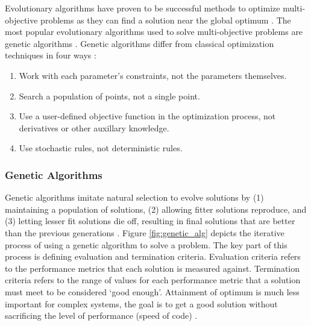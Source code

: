 Evolutionary algorithms have proven to be successful 
methods to optimize multi-objective problems \cite{krish_practical_2011} as 
they can find a solution near the global optimum \cite{renner_genetic_2003}. 
The most popular evolutionary algorithms used to solve multi-objective 
problems are genetic algorithms 
\cite{byrne_evolving_2014, krish_practical_2011}. 
Genetic algorithms differ from classical optimization techniques in four ways 
\cite{zames_genetic_1981}: 
\begin{enumerate}
        \item Work with each parameter's constraints, not
        the parameters themselves. 
        \item Search a population of points, not a single point. 
        \item Use a user-defined objective function in the 
        optimization process, not derivatives or other auxillary knowledge. 
        \item Use stochastic rules, not deterministic rules. 
\end{enumerate}

\subsubsection{Genetic Algorithms}
Genetic algorithms imitate natural selection to evolve solutions 
by (1) maintaining a population of solutions, (2) allowing 
fitter solutions reproduce, and (3) letting lesser fit solutions die off, 
resulting in final solutions that are better than the previous generations 
\cite{renner_genetic_2003}. 
Figure \ref{fig:genetic_alg} depicts the iterative process of using a genetic 
algorithm to solve a problem. 
The key part of this process is defining evaluation and termination criteria. 
Evaluation criteria refers to the performance metrics that each solution is 
measured against. 
Termination criteria refers to the range of values for each performance metric
that a solution must meet to be considered `good enough'. 
Attainment of optimum is much less important for complex systems, the goal is 
to get a good solution without sacrificing the level of performance (speed of 
code) \cite{zames_genetic_1981}. 

